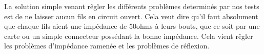  La solution simple venant rêgler les différents problèmes determinés par nos tests est de ne laisser aucun fils en circuit ouvert. Cela veut dire
 qu'il faut absolument que chaque fils aient une impédance de 50ohms à leurs bouts, que ce soit par une carte ou un simple connecteur possédant
 la bonne impédance. Cela vient rêgler les problèmes d'impédance ramenée et les problèmes de réflexion.